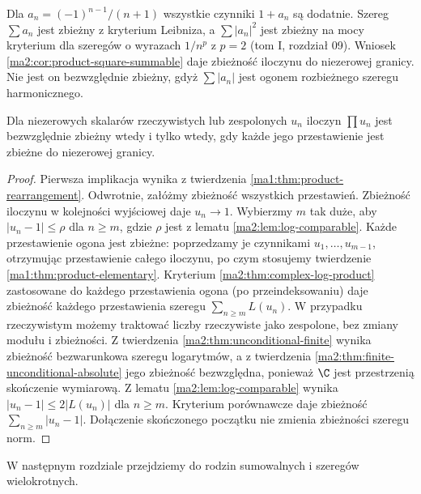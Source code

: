 \begin{przyklad}
\label{ma2:ex:product-alternating}
Dla $a_n=(-1)^{n-1}/(n+1)$ wszystkie czynniki $1+a_n$
są dodatnie. Szereg $\sum a_n$ jest zbieżny z kryterium
Leibniza, a $\sum |a_n|^2$ jest zbieżny na mocy kryterium
dla szeregów o wyrazach $1/n^p$ z $p=2$ (tom I, rozdział 09).
Wniosek \ref{ma2:cor:product-square-summable} daje
zbieżność iloczynu do niezerowej granicy.
Nie jest on bezwzględnie zbieżny, gdyż $\sum |a_n|$
jest ogonem rozbieżnego szeregu harmonicznego.
\end{przyklad}

\begin{twierdzenie}
\label{ma2:thm:product-unconditional-absolute}
Dla niezerowych skalarów rzeczywistych lub zespolonych
$u_n$ iloczyn $\prod u_n$ jest bezwzględnie zbieżny wtedy
i tylko wtedy, gdy każde jego przestawienie jest zbieżne
do niezerowej granicy.
\end{twierdzenie}
\begin{proof}
Pierwsza implikacja wynika z twierdzenia
\ref{ma1:thm:product-rearrangement}.
Odwrotnie, załóżmy zbieżność wszystkich przestawień.
Zbieżność iloczynu w kolejności wyjściowej daje
$u_n\to1$. Wybierzmy $m$ tak duże, aby
$|u_n-1|\le\rho$ dla $n\ge m$, gdzie $\rho$ jest
z lematu \ref{ma2:lem:log-comparable}.
Każde przestawienie ogona jest zbieżne: poprzedzamy
je czynnikami $u_1,\ldots,u_{m-1}$, otrzymując
przestawienie całego iloczynu, po czym stosujemy
twierdzenie \ref{ma1:thm:product-elementary}.
Kryterium \ref{ma2:thm:complex-log-product} zastosowane
do każdego przestawienia ogona (po przeindeksowaniu)
daje zbieżność każdego przestawienia szeregu
$\sum_{n\ge m}L(u_n)$. W przypadku rzeczywistym możemy
traktować liczby rzeczywiste jako zespolone, bez zmiany
modułu i zbieżności.
Z twierdzenia \ref{ma2:thm:unconditional-finite} wynika
zbieżność bezwarunkowa szeregu logarytmów, a z twierdzenia
\ref{ma2:thm:finite-unconditional-absolute} jego
zbieżność bezwzględna, ponieważ $\C$ jest przestrzenią
skończenie wymiarową. Z lematu
\ref{ma2:lem:log-comparable} wynika
$|u_n-1|\le2|L(u_n)|$ dla $n\ge m$.
Kryterium porównawcze daje zbieżność
$\sum_{n\ge m}|u_n-1|$. Dołączenie skończonego początku
nie zmienia zbieżności szeregu norm.
\end{proof}

W następnym rozdziale przejdziemy do rodzin sumowalnych
i szeregów wielokrotnych.
